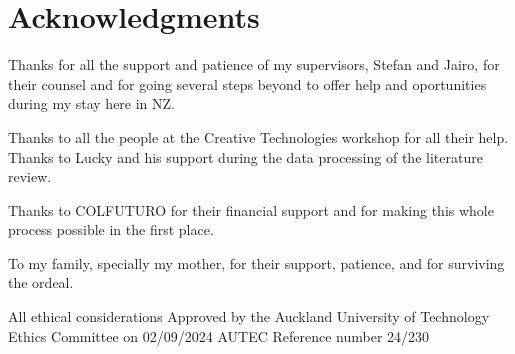 

\chapter*{Acknowledgments}

Thanks for all the support and patience of my supervisors, Stefan and Jairo, for their counsel and for going several steps beyond to offer help and oportunities during my stay here in NZ.

Thanks to all the people at the Creative Technologies workshop for all their help. Thanks to Lucky and his support during the data processing of the literature review.

Thanks to COLFUTURO for their financial support and for making this whole process possible in the first place.

To my family, specially my mother, for their support, patience, and for surviving the ordeal.

All ethical considerations Approved by the Auckland University of Technology Ethics Committee on 02/09/2024 AUTEC Reference number 24/230

